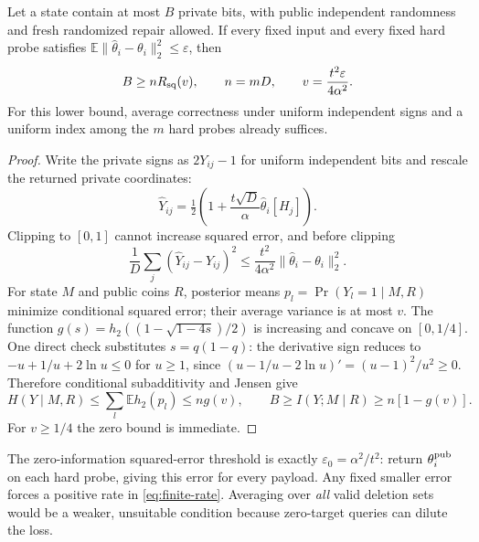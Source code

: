 \begin{theorem}
Let a state contain at most $B$ private bits, with public independent
randomness and fresh randomized repair allowed.  If every fixed input and
every fixed hard probe satisfies
$\mathbb E\|\widehat\theta_i-\theta_i\|_2^2\le\varepsilon$, then
\begin{equation}\label{eq:finite-rate}
 B\ge nR_{\rm sq}(v),\qquad
 n=mD,\qquad v=\frac{t^2\varepsilon}{4\alpha^2}.
\end{equation}
For this lower bound, average correctness under uniform independent signs
and a uniform index among the $m$ hard probes already suffices.
\end{theorem}
\begin{proof}
Write the private signs as $2Y_{ij}-1$ for uniform independent bits and
rescale the returned private coordinates:
\[
 \widehat Y_{ij}=\tfrac12\left(1+
                       \frac{t\sqrt D}\alpha\widehat\theta_i[H_j]\right).
\]
Clipping to $[0,1]$ cannot increase squared error, and before clipping
\[
 \frac1D\sum_j(\widehat Y_{ij}-Y_{ij})^2
 \le\frac{t^2}{4\alpha^2}\|\widehat\theta_i-\theta_i\|_2^2.
\]
For state $M$ and public coins $R$, posterior means
$p_l=\Pr(Y_l=1\mid M,R)$ minimize conditional squared error; their average
variance is at most $v$.  The function
$g(s)=h_2((1-\sqrt{1-4s})/2)$ is increasing and concave on $[0,1/4]$.
One direct check substitutes $s=q(1-q)$: the derivative sign reduces to
$-u+1/u+2\ln u\le0$ for $u\ge1$, since
$(u-1/u-2\ln u)'=(u-1)^2/u^2\ge0$.
Therefore conditional subadditivity and Jensen give
\[
 H(Y\mid M,R)\le\sum_l\mathbb E h_2(p_l)\le ng(v),\qquad
 B\ge I(Y;M\mid R)\ge n[1-g(v)].
\]
For $v\ge1/4$ the zero bound is immediate.
\end{proof}

The zero-information squared-error threshold is exactly
$\varepsilon_0=\alpha^2/t^2$: return $\theta_i^{\rm pub}$ on each hard
probe, giving this error for every payload.  Any fixed smaller error forces
a positive rate in \eqref{eq:finite-rate}.  Averaging over \emph{all} valid
deletion sets would be a weaker, unsuitable condition because zero-target
queries can dilute the loss.

